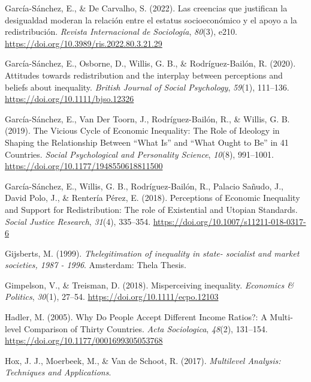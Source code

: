 \documentclass[
  12pt,
]{article}
\newlength{\cslhangindent}
\newenvironment{CSLReferences}[2] %
 {\begin{list}{}{%
  \setlength{\itemindent}{0pt}
  \setlength{\leftmargin}{0pt}
  \setlength{\parsep}{0pt}
  \ifodd #1
   \setlength{\leftmargin}{\cslhangindent}
   \setlength{\itemindent}{-1\cslhangindent}
  \fi
  \setlength{\itemsep}{#2\baselineskip}}}
 {\end{list}}
\begin{document}
\begin{CSLReferences}{1}{0}
García-Sánchez, E., \& De Carvalho, S. (2022). Las creencias que
justifican la desigualdad moderan la relaci{ó}n entre el estatus
socioecon{ó}mico y el apoyo a la redistribuci{ó}n. \emph{Revista
Internacional de Sociolog{í}a}, \emph{80}(3), e210.
\url{https://doi.org/10.3989/ris.2022.80.3.21.29}

García-Sánchez, E., Osborne, D., Willis, G. B., \& Rodríguez-Bailón, R.
(2020). Attitudes towards redistribution and the interplay between
perceptions and beliefs about inequality. \emph{British Journal of
Social Psychology}, \emph{59}(1), 111--136.
\url{https://doi.org/10.1111/bjso.12326}

García-Sánchez, E., Van Der Toorn, J., Rodríguez-Bailón, R., \& Willis,
G. B. (2019). The {Vicious Cycle} of {Economic Inequality}: {The Role}
of {Ideology} in {Shaping} the {Relationship Between} {``{What Is}''}
and {``{What Ought} to {Be}''} in 41 {Countries}. \emph{Social
Psychological and Personality Science}, \emph{10}(8), 991--1001.
\url{https://doi.org/10.1177/1948550618811500}

García-Sánchez, E., Willis, G. B., Rodríguez-Bailón, R., Palacio Sañudo,
J., David Polo, J., \& Rentería Pérez, E. (2018). Perceptions of
{Economic Inequality} and {Support} for {Redistribution}: {The} role of
{Existential} and {Utopian Standards}. \emph{Social Justice Research},
\emph{31}(4), 335--354. \url{https://doi.org/10.1007/s11211-018-0317-6}

Gijsberts, M. (1999). \emph{{Thelegitimation of inequality in state-
socialist and market societies, 1987 - 1996}}. Amsterdam: Thela Thesis.

Gimpelson, V., \& Treisman, D. (2018). Misperceiving inequality.
\emph{Economics \& Politics}, \emph{30}(1), 27--54.
\url{https://doi.org/10.1111/ecpo.12103}

Hadler, M. (2005). Why {Do People Accept Different Income Ratios}?: {A
Multi-level Comparison} of {Thirty Countries}. \emph{Acta Sociologica},
\emph{48}(2), 131--154. \url{https://doi.org/10.1177/0001699305053768}

Hox, J. J., Moerbeek, M., \& Van de Schoot, R. (2017). \emph{Multilevel
{Analysis}: {Techniques} and {Applications}}.


\end{CSLReferences}
\end{document}
